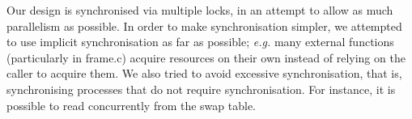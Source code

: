 Our design is synchronised via multiple locks, in an attempt to allow as much parallelism as possible.
In order to make synchronisation simpler, we attempted to use implicit synchronisation as far as possible; \textit{e.g.} many external functions (particularly in frame.c) acquire resources on their own instead of relying on the caller to acquire them.
We also tried to avoid excessive synchronisation, that is, synchronising processes that do not require synchronisation. For instance, it is possible to read concurrently from the swap table.
